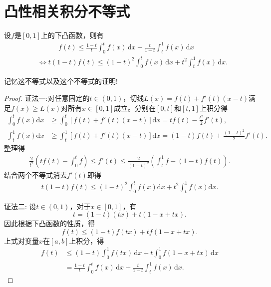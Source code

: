 \documentclass[../../main.tex]{subfiles}%
\begin{document}
\section{凸性相关积分不等式}

\begin{proposition}\label{proposition:凸性积分不等式}
设\( f \)是\([0,1]\)上的下凸函数，则有
\begin{align*}
&\qquad \quad  f(t) \leqslant \frac{1-t}{t} \int_0^t f(x)\,\text{d}x + \frac{t}{1-t}\int_t^1 f(x)\,\text{d}x
\\
&\iff t(1 - t)f(t) \leqslant (1 - t)^2 \int_{0}^{t} f(x) \, \mathrm{d}x + t^2 \int_{t}^{1} f(x) \, \mathrm{d}x.
\end{align*}
\end{proposition}
\begin{note}
记忆这不等式以及这个不等式的证明!
\end{note}
\begin{proof}

{\color{blue}证法一:}对任意固定的$t\in(0,1)$，切线$L(x)=f(t)+f'(t)(x-t)$满足$f(x)\geqslant L(x)$对所有$x\in[0,1]$成立。分别在$[0,t]$和$[t,1]$上积分得
\begin{align*}
\int_{0}^{t}f(x)\mathrm{d}x&\geqslant\int_{0}^{t}\left[f(t)+f'(t)(x-t)\right]\mathrm{d}x=tf(t)-\frac{t^{2}}{2}f'(t),\\
\int_{t}^{1}f(x)\mathrm{d}x&\geqslant\int_{t}^{1}\left[f(t)+f'(t)(x-t)\right]\mathrm{d}x=(1-t)f(t)+\frac{(1-t)^{2}}{2}f'(t).
\end{align*}
整理得
\begin{align*}
\frac{2}{t^{2}}\left(tf(t)-\int_{0}^{t}f\right)\leqslant f'(t)\leqslant\frac{2}{(1-t)^{2}}\left(\int_{t}^{1}f-(1-t)f(t)\right).
\end{align*}
结合两个不等式消去$f'(t)$即得
\begin{align*}
t(1-t)f(t)\leqslant(1-t)^{2}\int_{0}^{t}f(x)\mathrm{d}x+t^{2}\int_{t}^{1}f(x)\mathrm{d}x.
\end{align*}

{\color{blue}证法二:}
设\( t \in (0,1) \)，对于\( x \in [0,1] \)，有
\[
t = (1-t)(tx) + t(1 - x + tx).
\]
因此根据下凸函数的性质，得
\[
f(t) \leqslant (1-t)f(tx) + tf(1 - x + tx).
\]
上式对变量\( x \)在\([a,b]\)上积分，得
\begin{align*}
f(t) &\leqslant (1-t)\int_0^1 f(tx)\,\text{d}x + t\int_0^1 f(1 - x + tx)\,\text{d}x \\
&= \frac{1-t}{t}\int_0^t{f(x)\,\mathrm{d}x}+\frac{t}{1-t}\int_t^1{f(x)\,\mathrm{d}x}.
\end{align*}

\end{proof}
\end{document}
